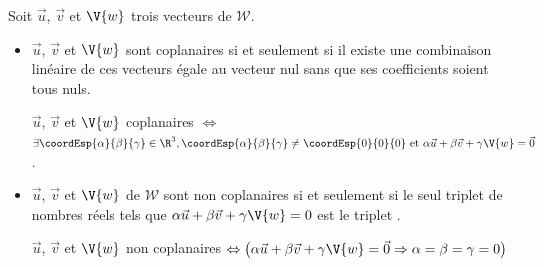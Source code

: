 \begin{propriete}[s]
 Soit $\vec{u}$, $\vec{v}$ et $\V{w}$ trois vecteurs de $\mathcal{W}$.
 \begin{itemize}
\item  $\vec{u}$, $\vec{v}$ et $\V{w}$ sont coplanaires si et seulement si il existe une combinaison linéaire de ces vecteurs égale au vecteur nul sans que ses coefficients soient tous nuls.
\par $\vec{u}$, $\vec{v}$ et $\V{w}$ coplanaires $\Leftrightarrow$ $\exists \coordEsp{\alpha}{\beta}{\gamma}\in \R^3, \coordEsp{\alpha}{\beta}{\gamma}\neq \coordEsp{0}{0}{0}\text{ et }\alpha\vec{u}+\beta\vec{v}+\gamma\V{w}=\vec{0}$.
\item $\vec{u}$, $\vec{v}$ et $\V{w}$ de $\mathcal{W}$ sont non coplanaires si et seulement si le seul triplet\coordEsp{\alpha}{\beta}{\gamma} de nombres réels tels que $\alpha\vec{u}+\beta\vec{v}+\gamma\V{w}=0$ est le triplet .
\par $\vec{u}$, $\vec{v}$ et $\V{w}$ non coplanaires $\Leftrightarrow \big(\alpha\vec{u}+\beta\vec{v}+\gamma\V{w}=\vec{0}\Rightarrow \alpha=\beta=\gamma=0\big)$
 \end{itemize}
\end{propriete}
